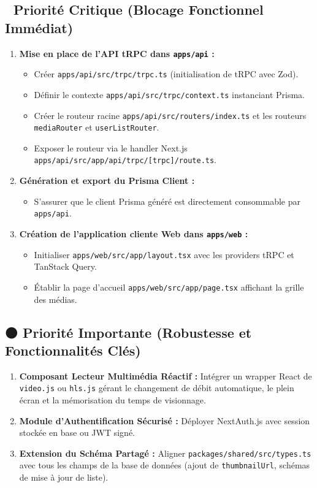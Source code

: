 \documentclass[11pt,a4paper]{article}
\begin{document}
\subsection{🔴 Priorité Critique (Blocage Fonctionnel Immédiat)}
\begin{enumerate}
    \item \textbf{Mise en place de l'API tRPC dans \texttt{apps/api} :}
    \begin{itemize}
        \item Créer \texttt{apps/api/src/trpc/trpc.ts} (initialisation de tRPC avec Zod).
        \item Définir le contexte \texttt{apps/api/src/trpc/context.ts} instanciant Prisma.
        \item Créer le routeur racine \texttt{apps/api/src/routers/index.ts} et les routeurs \texttt{mediaRouter} et \texttt{userListRouter}.
        \item Exposer le routeur via le handler Next.js \texttt{apps/api/src/app/api/trpc/[trpc]/route.ts}.
    \end{itemize}
    \item \textbf{Génération et export du Prisma Client :}
    \begin{itemize}
        \item S'assurer que le client Prisma généré est directement consommable par \texttt{apps/api}.
    \end{itemize}
    \item \textbf{Création de l'application cliente Web dans \texttt{apps/web} :}
    \begin{itemize}
        \item Initialiser \texttt{apps/web/src/app/layout.tsx} avec les providers tRPC et TanStack Query.
        \item Établir la page d'accueil \texttt{apps/web/src/app/page.tsx} affichant la grille des médias.
    \end{itemize}
\end{enumerate}

\subsection{🟠 Priorité Importante (Robustesse et Fonctionnalités Clés)}
\begin{enumerate}
    \item \textbf{Composant Lecteur Multimédia Réactif :} Intégrer un wrapper React de \texttt{video.js} ou \texttt{hls.js} gérant le changement de débit automatique, le plein écran et la mémorisation du temps de visionnage.
    \item \textbf{Module d'Authentification Sécurisé :} Déployer NextAuth.js avec session stockée en base ou JWT signé.
    \item \textbf{Extension du Schéma Partagé :} Aligner \texttt{packages/shared/src/types.ts} avec tous les champs de la base de données (ajout de \texttt{thumbnailUrl}, schémas de mise à jour de liste).
\end{enumerate}
\end{document}
